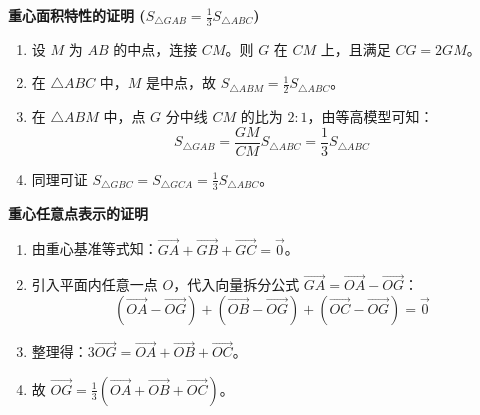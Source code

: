 \begin{proofbox}
\textbf{重心面积特性的证明 ($S_{\triangle GAB} = \frac{1}{3}S_{\triangle ABC}$)}
\begin{enumerate}
    \item 设 $M$ 为 $AB$ 的中点，连接 $CM$。则 $G$ 在 $CM$ 上，且满足 $CG = 2GM$。
    \item 在 $\triangle ABC$ 中，$M$ 是中点，故 $S_{\triangle ABM} = \frac{1}{2}S_{\triangle ABC}$。
    \item 在 $\triangle ABM$ 中，点 $G$ 分中线 $CM$ 的比为 $2:1$，由等高模型可知：
    \[ S_{\triangle GAB} = \frac{GM}{CM} S_{\triangle ABC} = \frac{1}{3} S_{\triangle ABC} \]
    \item 同理可证 $S_{\triangle GBC} = S_{\triangle GCA} = \frac{1}{3} S_{\triangle ABC}$。
\end{enumerate}

\tcbline

\textbf{重心任意点表示的证明}
\begin{enumerate}
    \item 由重心基准等式知：$\vec{GA} + \vec{GB} + \vec{GC} = \vec{0}$。
    \item 引入平面内任意一点 $O$，代入向量拆分公式 $\vec{GA} = \vec{OA} - \vec{OG}$：
    \[ (\vec{OA} - \vec{OG}) + (\vec{OB} - \vec{OG}) + (\vec{OC} - \vec{OG}) = \vec{0} \]
    \item 整理得：$3\vec{OG} = \vec{OA} + \vec{OB} + \vec{OC}$。
    \item 故 $\vec{OG} = \frac{1}{3}(\vec{OA} + \vec{OB} + \vec{OC})$。
\end{enumerate}
\end{proofbox}